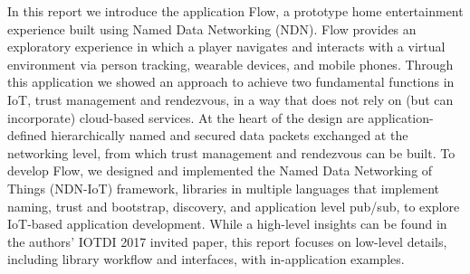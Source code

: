 In this report we introduce the application Flow, a prototype home entertainment experience built using Named Data Networking (NDN). Flow provides an exploratory experience in which a player navigates and interacts with a virtual environment via person tracking, wearable devices, and mobile phones. 
Through this application we showed an approach to achieve two fundamental functions in IoT, trust management and rendezvous, in a way that does not rely on (but can incorporate) cloud-based services.
At the heart of the design are application-defined hierarchically named and secured data packets exchanged at the networking level, from which trust management and rendezvous can be built. 
To develop Flow, we designed and implemented the Named Data Networking of Things (NDN-IoT) framework, libraries in multiple languages that implement naming, trust and bootstrap, discovery, and application level pub/sub, to explore IoT-based application development.
While a high-level insights can be found in the authors' IOTDI 2017 invited paper, this report focuses on low-level details, including library workflow and interfaces, with in-application examples.

